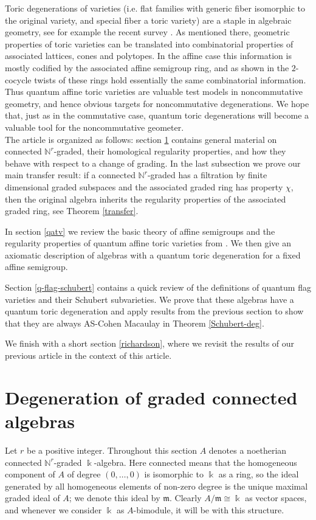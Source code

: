 \documentclass[11pt,fleqn]{article}
\newcommand\NN{\mathbb N}
\renewcommand\k{\Bbbk}
\newcommand\m{\mathfrak m}
\begin{document}
Toric degenerations of varieties (i.e. flat families with generic fiber 
isomorphic to the original variety, and special fiber a toric variety) 
are a staple in algebraic geometry, see for example the recent survey 
\cite{FFL}. As mentioned there, geometric properties of toric varieties can be 
translated into combinatorial properties of associated lattices, cones and 
polytopes. In the affine case this information is mostly codified by the 
associated affine semigroup ring, and as shown in \cite{RZ2} the $2$-cocycle 
twists of these rings hold essentially the same combinatorial information. 
Thus quantum affine toric varieties are valuable test models in noncommutative 
geometry, and hence obvious targets for noncommutative degenerations. We hope 
that, just as in the commutative case, quantum toric degenerations will become 
a valuable tool for the noncommutative geometer.
\\

The article is organized as follows: section \ref{graded-connected-algebras} 
contains general material on connected $\NN^r$-graded, their homological 
regularity properties, and how they behave with respect to a change of 
grading. In the last subsection we prove our main transfer result: if a 
connected $\NN^r$-graded has a filtration by finite dimensional graded 
subspaces and the associated graded ring has property $\chi$, then the 
original algebra inherits the regularity properties of the associated graded 
ring, see Theorem \ref{transfer}. 

In section \ref{qatv} we review the basic theory of affine semigroups and 
the regularity properties of quantum affine toric varieties from \cite{RZ2}. 
We then give an axiomatic description of algebras with a quantum toric 
degeneration for a fixed affine semigroup.

Section \ref{q-flag-schubert} contains a quick review of the definitions of 
quantum flag varieties and their Schubert subvarieties. We prove that these
algebras have a quantum toric degeneration and apply results from the previous
section to show that they are always AS-Cohen Macaulay in Theorem 
\ref{Schubert-deg}. 

We finish with a short section \ref{richardson}, where we revisit the results 
of our previous article \cite{RZ} in the context of this article.

\section{Degeneration of graded connected algebras}
\label{graded-connected-algebras}
Let $r$ be a positive integer. Throughout this section $A$ denotes a 
noetherian connected $\NN^{r}$-graded $\k$-algebra. Here connected means that 
the homogeneous component of $A$ of degree $(0, \ldots, 0)$ is isomorphic to 
$\k$ as a ring, so the ideal generated by all homogeneous elements of non-zero 
degree is the unique maximal graded ideal of $A$; we denote this ideal by 
$\m$. Clearly $A/\m \cong \k$ as vector spaces, and whenever we consider $\k$ 
as $A$-bimodule, it will be with this structure.
\end{document}
